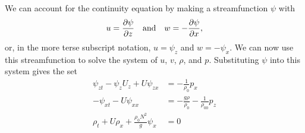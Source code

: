 \documentclass[10pt]{article}
\begin{document}
We can account for the continuity equation by making a streamfunction $\psi$ with
\begin{align}
    u = \pdv{\psi}{z} \qq{and} w = -\pdv{\psi}{x},
\end{align}
or, in the more terse subscript notation, $u = \psi_z$ and $w = -\psi_x$. We can now use this streamfunction to solve the system of $u$, $v$, $\rho$, and $p$. Substituting $\psi$ into this system gives the set
\begin{align}
    \psi_{zt} -\psi_zU_z + U\psi_{zx} & = -\frac{1}{\rho_0}p_x \\
    -\psi_{xt} - U\psi_{xx} & = -\frac{g\rho}{\rho_0} - \frac{1}{\rho_00}p_z \\
    \rho_t + U\rho_x + \frac{\rho_0N^2}{g}\psi_x & = 0
\end{align}
\end{document}
